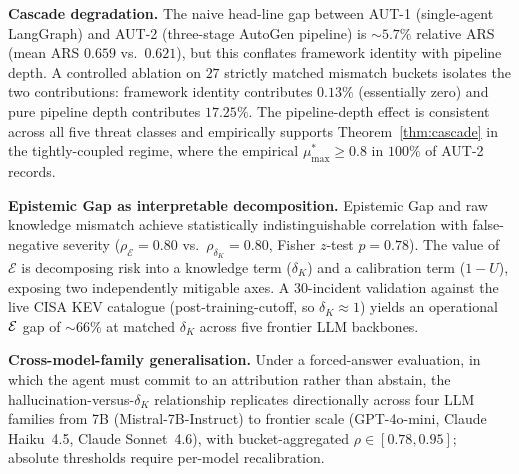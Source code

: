 \textbf{Cascade degradation.} The naive head-line gap between AUT-1
(single-agent LangGraph) and AUT-2 (three-stage AutoGen pipeline) is
$\sim 5.7\%$ relative ARS (mean ARS $0.659$ vs.\ $0.621$), but this
conflates framework identity with pipeline depth. A controlled
ablation on $27$ strictly matched mismatch buckets isolates the two
contributions: framework identity contributes $\mathbf{0.13\%}$
(essentially zero) and pure pipeline depth contributes
$\mathbf{17.25\%}$. The pipeline-depth effect is consistent across
all five threat classes and empirically supports
Theorem~\ref{thm:cascade} in the tightly-coupled regime, where the
empirical $\mu^*_{\max} \geq 0.8$ in $100\%$ of AUT-2 records.

\textbf{Epistemic Gap as interpretable decomposition.} Epistemic Gap
and raw knowledge mismatch achieve statistically indistinguishable
correlation with false-negative severity
($\rho_\mathcal{E} = 0.80$ vs.\ $\rho_{\delta_K} = 0.80$, Fisher
$z$-test $p = 0.78$). The value of $\mathcal{E}$ is decomposing risk
into a knowledge term ($\delta_K$) and a calibration term ($1 - U$),
exposing two independently mitigable axes. A 30-incident validation
against the live CISA KEV catalogue (post-training-cutoff, so
$\delta_K \approx 1$) yields an operational $\mathcal{E}$ gap of $\sim 66\%$
at matched $\delta_K$ across five frontier LLM backbones.

\textbf{Cross-model-family generalisation.} Under a forced-answer
evaluation, in which the agent must commit to an attribution rather than
abstain, the hallucination-versus-$\delta_K$ relationship replicates
directionally across four LLM families from 7B (Mistral-7B-Instruct) to
frontier scale (GPT-4o-mini, Claude Haiku~4.5, Claude Sonnet~4.6), with
bucket-aggregated $\rho \in [0.78, 0.95]$; absolute thresholds require
per-model recalibration.
